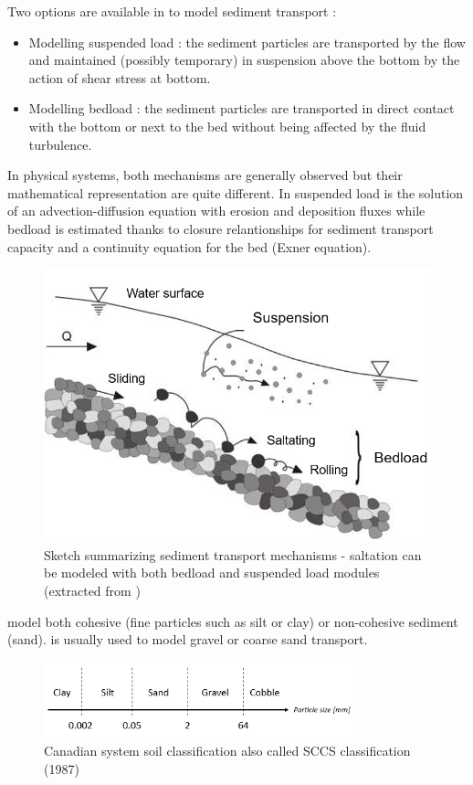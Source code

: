 Two options are available in \courlis to model sediment transport : 
\begin{itemize}
	\item Modelling suspended load : the sediment particles are transported by the flow and maintained (possibly temporary) in suspension above the bottom by the action of shear stress at bottom. 
	\item Modelling bedload : the sediment particles are transported in direct contact with the bottom or next to the bed without being affected by the fluid turbulence.
\end{itemize}
In physical systems, both mechanisms are generally observed but their mathematical representation are quite different. In \courlis suspended load is the solution of an advection-diffusion equation with erosion and deposition fluxes while bedload is estimated thanks to closure relantionships for sediment transport capacity and a continuity equation for the bed (Exner equation). 

\begin{figure}[htb!]
    \centering
    \includegraphics[width=.8\textwidth]{./graphics/transport_mechanisms.png}
    \caption{Sketch summarizing sediment transport mechanisms - saltation can be modeled with both bedload and suspended load modules (extracted from \cite{univ_lyon})}
    \label{fig:mechanisms}
\end{figure}

\Csuspension model both cohesive (fine particles such as silt or clay) or non-cohesive sediment (sand). 
\Cbedload is usually used to model gravel or coarse sand transport. 

\begin{figure}[htb!]
    \centering
    \includegraphics[width=0.8\textwidth]{./graphics/sediment_sizes.png}
    \caption{Canadian system soil classification also called SCCS classification (1987)}
    \label{fig:sediment_sizes}
\end{figure}





